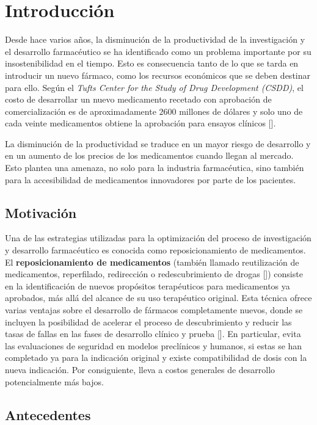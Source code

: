 \chapter*{Introducción}\label{chapter:introduction}

Desde hace varios años, la disminución de la productividad de la investigación y el desarrollo farmacéutico se ha identificado como un problema importante por su insostenibilidad en el tiempo. Esto es consecuencia tanto de lo que se tarda en introducir un nuevo fármaco, como los recursos económicos que se deben destinar para ello. Según el \textit{Tufts Center for the Study of Drug Development (CSDD)}, el costo de desarrollar un nuevo medicamento recetado con aprobación de comercialización es de aproximadamente $2600$ millones de dólares y solo uno de cada veinte medicamentos obtiene la aprobación para ensayos clínicos [\cite{alcim}].

La disminución de la productividad se traduce en un mayor riesgo de desarrollo y en un aumento de los precios de los medicamentos cuando llegan al mercado. Esto plantea una amenaza, no solo para la industria farmacéutica, sino también para la accesibilidad de medicamentos innovadores por parte de los pacientes.

\section*{Motivación}
Una de las estrategias utilizadas para la optimización del proceso de investigación y desarrollo farmacéutico es conocida como reposicionamiento de medicamentos.
El \textbf{reposicionamiento de medicamentos} (también llamado reutilización de medicamentos, reperfilado, redirección o redescubrimiento de drogas [\cite{repurposingconcept}]) consiste en la identificación de nuevos propósitos terapéuticos para medicamentos ya aprobados, más allá del alcance de su uso terapéutico original. Esta técnica ofrece varias ventajas sobre el desarrollo de fármacos completamente nuevos, donde se incluyen la posibilidad de acelerar el proceso de descubrimiento y reducir las tasas de fallas en las fases de desarrollo clínico y prueba [\cite{advantages}]. En particular, evita las evaluaciones de seguridad en modelos preclínicos y humanos, si estas se han completado ya para la indicación original y existe compatibilidad de dosis con la nueva indicación. Por consiguiente, lleva a costos generales de desarrollo potencialmente más bajos.

\section*{Antecedentes}


